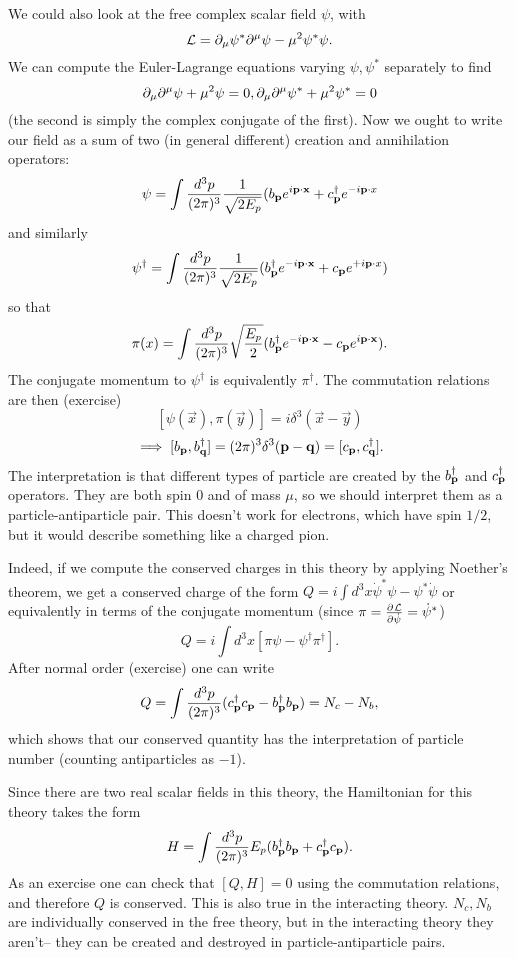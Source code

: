 We could also look at the free complex scalar field $\psi$, with
$$\mathcal L = \partial_\mu \psi^* \partial^\mu \psi - \mu^2 \psi^* \psi.$$
We can compute the Euler-Lagrange equations varying $\psi,\psi^*$ separately to find
$$\partial_\mu \partial^\mu \psi + \mu^2 \psi=0,\partial_\mu \partial^\mu \psi^*+\mu^2 \psi^*=0$$
(the second is simply the complex conjugate of the first).
Now we ought to write our field as a sum of two (in general different) creation and annihilation operators:
$$\psi=\int \frac{d^3p}{(2\pi)^3}\frac{1}{\sqrt{2E_p}} (b_{\boldsymbol{\mathbf{p}}} e^{i \boldsymbol{\mathbf{p}} \cdot \boldsymbol{\mathbf{x}}} + c_{\boldsymbol{\mathbf{p}}}^\dagger e^{-i \boldsymbol{\mathbf{p}} \cdot x}$$
and similarly
$$\psi^\dagger=\int \frac{d^3p}{(2\pi)^3} \frac{1}{\sqrt{2E_p}} (b_{\boldsymbol{\mathbf{p}}}^\dagger e^{-i \boldsymbol{\mathbf{p}} \cdot \boldsymbol{\mathbf{x}}} + c_{\boldsymbol{\mathbf{p}}} e^{+i \boldsymbol{\mathbf{p}} \cdot x})$$
so that
$$\pi(x)=\int \frac{d^3p}{(2\pi)^3} \sqrt{\frac{E_p}{2}} (b_{\boldsymbol{\mathbf{p}}}^\dagger e^{-i \boldsymbol{\mathbf{p}} \cdot \boldsymbol{\mathbf{x}}}-c_{\boldsymbol{\mathbf{p}}} e^{i \boldsymbol{\mathbf{p}} \cdot \boldsymbol{\mathbf{x}}}).$$
The conjugate momentum to $\psi^\dagger$ is equivalently $\pi^\dagger$. The commutation relations are then (exercise)
$$[\psi(\vec x), \pi(\vec y)]=i\delta^3(\vec x - \vec y)$$
$$\implies [b_{\boldsymbol{\mathbf{p}}},b_{\boldsymbol{\mathbf{q}}}^\dagger]=(2\pi)^3 \delta^3 (\boldsymbol{\mathbf{p}} - \boldsymbol{\mathbf{q}})=[c_{\boldsymbol{\mathbf{p}}},c_{\boldsymbol{\mathbf{q}}}^\dagger].$$
The interpretation is that different types of particle are created by the $b_{\boldsymbol{\mathbf{p}}}^\dagger$ and $c_{\boldsymbol{\mathbf{p}}}^\dagger$ operators. They are both spin $0$ and of mass $\mu$, so we should interpret them as a particle-antiparticle pair. This doesn't work for electrons, which have spin $1/2$, but it would describe something like a charged pion.

Indeed, if we compute the conserved charges in this theory by applying Noether's theorem, we get a conserved charge of the form
$Q=i\int d^3 x \dot \psi^* \psi - \psi^* \dot \psi$ or equivalently in terms of the conjugate momentum (since $\pi = \frac{\partial^{} \mathcal L}{\partial \dot \psi ^{}}=\dot \psi^*$)
$$Q=i\int d^3 x [\pi \psi - \psi^\dagger \pi^\dagger].$$
After normal order (exercise) one can write
$$Q=\int \frac{d^3 p}{(2\pi)^3} (c_{\boldsymbol{\mathbf{p}}}^\dagger c_{\boldsymbol{\mathbf{p}}}- b_{\boldsymbol{\mathbf{p}}}^\dagger b_{\boldsymbol{\mathbf{p}}})=N_c-N_b,$$
which shows that our conserved quantity has the interpretation of particle number (counting antiparticles as $-1$).

Since there are two real scalar fields in this theory, the Hamiltonian for this theory takes the form
$$H=\int \frac{d^3p}{(2\pi)^3} E_p(b_{\boldsymbol{\mathbf{p}}}^\dagger b_{\boldsymbol{\mathbf{p}}}+c_{\boldsymbol{\mathbf{p}}}^\dagger c_{\boldsymbol{\mathbf{p}}}).$$
As an exercise one can check that $[Q,H]=0$ using the commutation relations, and therefore $Q$ is conserved. This is also true in the interacting theory. $N_c,N_b$ are individually conserved in the free theory, but in the interacting theory they aren't-- they can be created and destroyed in particle-antiparticle pairs.